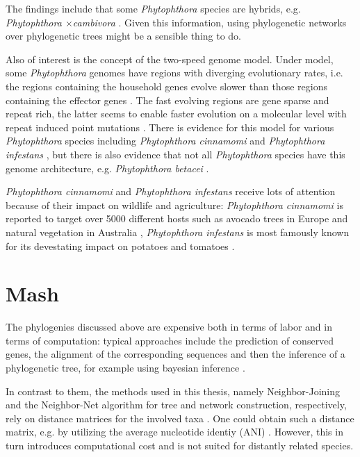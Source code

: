 The findings include that some \textit{Phytophthora} species are
hybrids, e.g. \textit{Phytophthora $\times$cambivora}
\cite{jungSixNewPhytophthora2017,vanpouckeUnravellingHybridizationPhytophthora2021}.
Given this information, using phylogenetic networks over phylogenetic trees
might be a sensible thing to do.

Also of interest is the concept of the two-speed genome model. Under model, some
\textit{Phytophthora} genomes have regions with diverging evolutionary rates,
i.e. the regions containing the household genes evolve slower than those regions
containing the effector genes \cite{dongTwospeedGenomesFilamentous2015}. The
fast evolving regions are gene sparse and repeat rich, the latter seems to
enable faster evolution on a molecular level with repeat induced point mutations
\cite{dongTwospeedGenomesFilamentous2015}. There is evidence for this model for
various \textit{Phytophthora} species including \textit{Phytophthora cinnamomi}
\cite{engelbrechtGenomeDestructiveOomycete2021} and \textit{Phytophthora
infestans}
\cite{ayala-usmaWholeGenomeDuplication2021,dongTwospeedGenomesFilamentous2015},
but there is also evidence that not all \textit{Phytophthora} species have this
genome architecture, e.g. \textit{Phytophthora betacei}
\cite{ayala-usmaWholeGenomeDuplication2021}.

\textit{Phytophthora cinnamomi} and \textit{Phytophthora infestans} receive lots
of attention because of their impact on wildlife and agriculture:
\textit{Phytophthora cinnamomi} is reported to target over 5000 different hosts
such as avocado trees in Europe and natural vegetation in Australia
\cite{hardhamPhytophthoraCinnamomi2018,solis-garciaPhytophthoraRootRot2020},
\textit{Phytophthora infestans} is most famously known for its devestating
impact on potatoes and tomatoes \cite{ayala-usmaWholeGenomeDuplication2021}.


\section{Mash}
The phylogenies discussed above are expensive both in terms of labor and in
terms of computation: typical approaches include the prediction of conserved
genes, the alignment of the corresponding sequences and then the inference of a
phylogenetic tree, for example using bayesian inference
\cite{abadPhytophthoraTaxonomicPhylogenetic2023a,winkworthComparativeAnalysesComplete2022}.

In contrast to them, the methods used in this thesis, namely Neighbor-Joining
and the Neighbor-Net algorithm for tree and network construction, respectively,
rely on distance matrices for the involved taxa
\cite{saitouNeighborjoiningMethodNew1987,bryantNeighborNetImprovedAlgorithms2023,bryantNeighborNetAgglomerativeMethod2004}.
One could obtain such a distance matrix, e.g. by utilizing the average
nucleotide identiy (ANI) \cite{leeOrthoANIImprovedAlgorithm2016}. However, this
in turn introduces computational cost and is not suited for distantly related
species.

